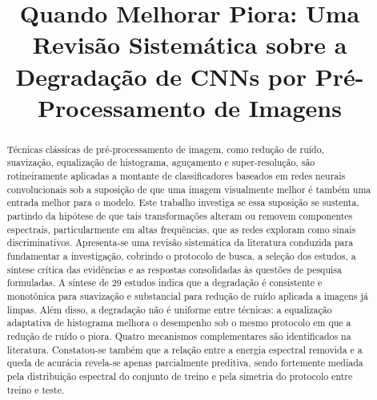 \documentclass[conference]{IEEEtran}
\begin{document}
\title{Quando Melhorar Piora: Uma Revisão Sistemática sobre a Degradação de CNNs por Pré-Processamento de Imagens}

\author{
\and
{}
\and
{}
}

\maketitle

\begin{abstract}
Técnicas clássicas de pré-processamento de imagem, como redução de ruído,
suavização, equalização de histograma, aguçamento e super-resolução, são
rotineiramente aplicadas a montante de classificadores baseados em redes
neurais convolucionais sob a suposição de que uma imagem visualmente melhor
é também uma entrada melhor para o modelo. Este trabalho investiga se essa
suposição se sustenta, partindo da hipótese de que tais transformações alteram
ou removem componentes espectrais, particularmente em altas frequências, que
as redes exploram como sinais discriminativos. Apresenta-se uma revisão
sistemática da literatura conduzida para fundamentar a investigação, cobrindo o
protocolo de busca, a seleção dos estudos, a síntese crítica das evidências e
as respostas consolidadas às questões de pesquisa formuladas. A síntese de 29
estudos indica que a degradação é consistente e monotônica para suavização e
substancial para redução de ruído aplicada a imagens já limpas. Além disso, a degradação 
não é uniforme entre técnicas: a equalização adaptativa de histograma melhora o
desempenho sob o mesmo protocolo em que a redução de ruído o piora. Quatro
mecanismos complementares são identificados na literatura. Constatou-se também que a relação entre a
energia espectral removida e a queda de acurácia revela-se apenas parcialmente
preditiva, sendo fortemente mediada pela distribuição espectral do conjunto de treino e pela
simetria do protocolo entre treino e teste.
\end{abstract}
\end{document}
